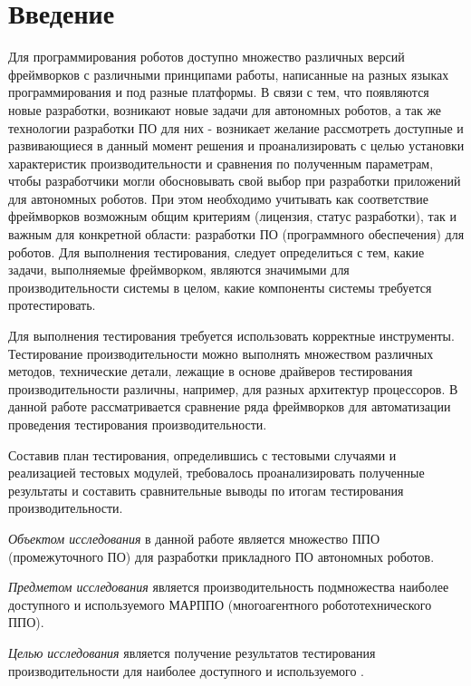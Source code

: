 \chapter*{Введение}

Для программирования роботов доступно множество различных версий фреймворков с различными принципами работы, написанные на разных языках программирования и под разные платформы. В связи с тем, что появляются новые разработки, возникают новые задачи для автономных роботов, а так же технологии разработки ПО для них - возникает желание рассмотреть доступные и развивающиеся в данный момент решения и проанализировать с целью установки характеристик производительности и сравнения по полученным параметрам, чтобы разработчики могли обосновывать свой выбор при разработки приложений для автономных роботов. При этом необходимо учитывать как соответствие фреймворков возможным общим критериям (лицензия, статус разработки), так и важным для конкретной области: разработки ПО (программного обеспечения) для роботов. Для выполнения тестирования, следует определиться с тем, какие задачи, выполняемые фреймворком, являются значимыми для производительности системы в целом, какие компоненты системы требуется протестировать.

Для выполнения тестирования требуется использовать корректные инструменты. Тестирование производительности можно выполнять множеством различных методов, технические детали, лежащие в основе драйверов тестирования производительности различны, например, для разных архитектур процессоров. В данной работе рассматривается сравнение ряда фреймворков для автоматизации проведения тестирования производительности.

Составив план тестирования, определившись с тестовыми случаями и реализацией тестовых модулей, требовалось проанализировать полученные результаты и составить сравнительные выводы по итогам тестирования производительности.

\textit{Объектом исследования} в данной работе является множество ППО (промежуточного ПО) для разработки прикладного ПО автономных роботов.

\textit{Предметом исследования} является производительность подмножества наиболее доступного и используемого МАРППО (многоагентного робототехнического ППО).

\textit{Целью исследования} является получение результатов тестирования производительности для наиболее доступного и используемого \marm{}.